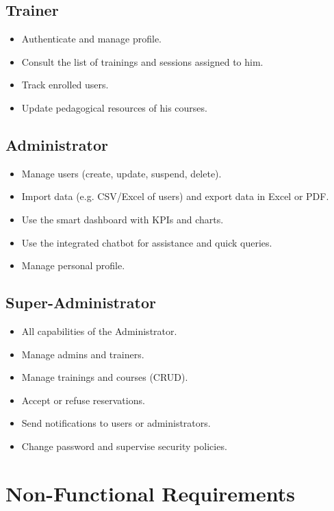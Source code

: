 \subsection{Trainer}
\begin{itemize}[leftmargin=2em,itemsep=0.2em]
  \item Authenticate and manage profile.
  \item Consult the list of trainings and sessions assigned to him.
  \item Track enrolled users.
  \item Update pedagogical resources of his courses.
\end{itemize}

\subsection{Administrator}
\begin{itemize}[leftmargin=2em,itemsep=0.2em]
  \item Manage users (create, update, suspend, delete).
  \item Import data (e.g. CSV/Excel of users) and export data in Excel or PDF.
  \item Use the smart dashboard with KPIs and charts.
  \item Use the integrated chatbot for assistance and quick queries.
  \item Manage personal profile.
\end{itemize}

\subsection{Super-Administrator}
\begin{itemize}[leftmargin=2em,itemsep=0.2em]
  \item All capabilities of the Administrator.
  \item Manage admins and trainers.
  \item Manage trainings and courses (CRUD).
  \item Accept or refuse reservations.
  \item Send notifications to users or administrators.
  \item Change password and supervise security policies.
\end{itemize}

\section{Non-Functional Requirements}

